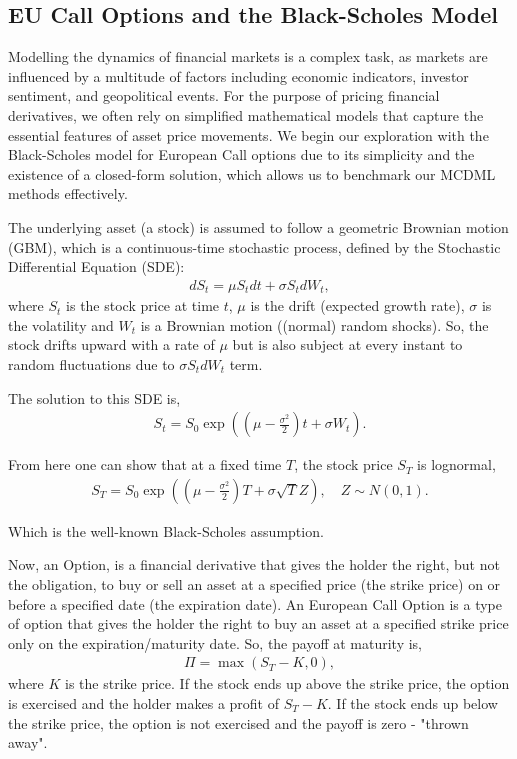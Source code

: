 \subsection{EU Call Options and the Black-Scholes Model}

Modelling the dynamics of financial markets is a complex task, as markets are influenced by a multitude of factors including economic indicators, investor sentiment, and geopolitical events. For the purpose of pricing financial derivatives, we often rely on simplified mathematical models that capture the essential features of asset price movements. We begin our exploration with the Black-Scholes model for European Call options due to its simplicity and the existence of a closed-form solution, which allows us to benchmark our MCDML methods effectively.

The underlying asset (a stock) is assumed to follow a geometric Brownian motion (GBM), which is a continuous-time stochastic process, defined by the Stochastic Differential Equation (SDE):
\begin{align*}
    dS_t = \mu S_t dt + \sigma S_t dW_t,
\end{align*}
where $S_t$ is the stock price at time $t$, $\mu$ is the drift (expected growth rate), $\sigma$ is the volatility and $W_t$ is a Brownian motion ((normal) random shocks). So, the stock drifts upward with a rate of $\mu$ but is also subject at every instant to random fluctuations due to $\sigma S_t dW_t$ term.

The solution to this SDE is,
\begin{align*}
    S_t = S_0 \exp\left( \left(\mu - \frac{\sigma^2}{2}\right)t + \sigma W_t \right).
\end{align*}

From here one can show that at a fixed time $T$, the stock price $S_T$ is lognormal, 
\begin{align*}
    S_T = S_0 \exp\left( \left(\mu - \frac{\sigma^2}{2}\right)T + \sigma \sqrt{T} Z \right), \quad Z \sim N(0,1).
\end{align*}

Which is the well-known Black-Scholes assumption. 

Now, an Option, is a financial derivative that gives the holder the right, but not the obligation, to buy or sell an asset at a specified price (the strike price) on or before a specified date (the expiration date). An European Call Option is a type of option that gives the holder the right to buy an asset at a specified strike price only on the expiration/maturity date. So, the payoff at maturity is, 
\begin{align*}
    \Pi = \max(S_T - K, 0),
\end{align*}
where $K$ is the strike price. If the stock ends up above the strike price, the option is exercised and the holder makes a profit of $S_T - K$. If the stock ends up below the strike price, the option is not exercised and the payoff is zero - "thrown away".


